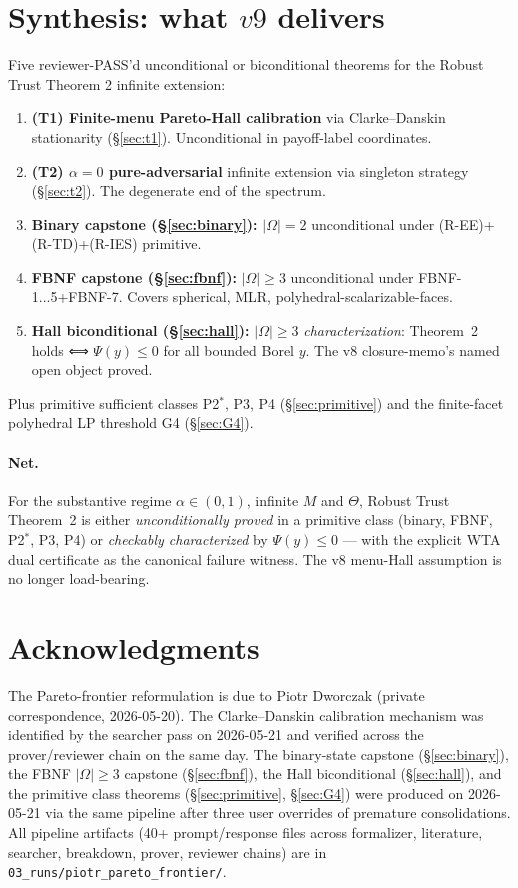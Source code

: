 \documentclass[11pt]{article}
\theoremstyle{definition}
\theoremstyle{remark}
\begin{document}
\section{Synthesis: what $v9$ delivers}\label{sec:synthesis}

Five reviewer-PASS'd unconditional or biconditional theorems for the
Robust Trust Theorem 2 infinite extension:

\begin{enumerate}
  \item \textbf{(T1) Finite-menu Pareto-Hall calibration} via
    Clarke--Danskin stationarity (\S\ref{sec:t1}). Unconditional in
    payoff-label coordinates.
  \item \textbf{(T2) $\alpha=0$ pure-adversarial} infinite extension
    via singleton strategy (\S\ref{sec:t2}). The degenerate end of the
    spectrum.
  \item \textbf{Binary capstone (\S\ref{sec:binary}):} $|\Omega|=2$
    unconditional under (R-EE)+(R-TD)+(R-IES) primitive.
  \item \textbf{FBNF capstone (\S\ref{sec:fbnf}):} $|\Omega|\ge 3$
    unconditional under FBNF-1...5+FBNF-7. Covers spherical, MLR,
    polyhedral-scalarizable-faces.
  \item \textbf{Hall biconditional (\S\ref{sec:hall}):} $|\Omega|\ge 3$
    \emph{characterization}: Theorem~2 holds ⟺ $\Psi(y)\le 0$ for all
    bounded Borel $y$. The v8 closure-memo's named open object proved.
\end{enumerate}

Plus primitive sufficient classes P2$^*$, P3, P4 (\S\ref{sec:primitive})
and the finite-facet polyhedral LP threshold G4 (\S\ref{sec:G4}).

\paragraph{Net.} For the substantive regime $\alpha\in(0,1)$,
infinite $M$ and $\Theta$, Robust Trust Theorem~2 is either
\emph{unconditionally proved} in a primitive class (binary, FBNF,
P2$^*$, P3, P4) or \emph{checkably characterized} by $\Psi(y)\le 0$ —
with the explicit WTA dual certificate as the canonical failure
witness. The v8 menu-Hall assumption is no longer load-bearing.

\section*{Acknowledgments}

The Pareto-frontier reformulation is due to Piotr Dworczak (private
correspondence, 2026-05-20). The Clarke--Danskin calibration mechanism
was identified by the searcher pass on 2026-05-21 and verified across
the prover/reviewer chain on the same day. The binary-state capstone
(\S\ref{sec:binary}), the FBNF $|\Omega|\ge 3$ capstone
(\S\ref{sec:fbnf}), the Hall biconditional (\S\ref{sec:hall}), and the
primitive class theorems (\S\ref{sec:primitive}, \S\ref{sec:G4}) were
produced on 2026-05-21 via the same pipeline after three user
overrides of premature consolidations. All pipeline artifacts (40+
prompt/response files across formalizer, literature, searcher,
breakdown, prover, reviewer chains) are in
\texttt{03\_runs/piotr\_pareto\_frontier/}.
\end{document}
